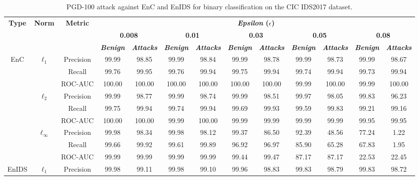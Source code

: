 \documentclass[conference]{IEEEtran}
\begin{document}
	\begin{table}[h]
		\caption{PGD-100 attack against EnC and EnIDS for binary classification on the CIC IDS2017 dataset.}
		\small
		\setlength{\tabcolsep}{1.6pt}
		\centering
		\label{tab:cic_bin_pgd}
		\begin{tabular}{|c|c|c|c|c|c|c|c|c|c|c|c|c|}
			\hline
			\multirow{3}{*}{\textbf{Type}} & \multirow{3}{*}{\textbf{Norm}} & \multirow{3}{*}{\textbf{Metric}} & \multicolumn{10}{c|}{\textbf{\textsl{Epsilon} ($\epsilon$)}} \\
			\cline{4-13}
			& & & \multicolumn{2}{c|}{\textbf{0.008}} & \multicolumn{2}{c|}{\textbf{0.01}} & \multicolumn{2}{c|}{\textbf{0.03}} & \multicolumn{2}{c|}{\textbf{0.05}} & \multicolumn{2}{c|}{\textbf{0.08}} \\
			\cline{4-13}
			& & & \textbf{\textsl{Benign}} & \textbf{\textsl{Attacks}} & \textbf{\textsl{Benign}} & \textbf{\textsl{Attacks}} & \textbf{\textsl{Benign}} & \textbf{\textsl{Attacks}} & \textbf{\textsl{Benign}} & \textbf{\textsl{Attacks}} & \textbf{\textsl{Benign}} & \textbf{\textsl{Attacks}} \\
			\hline
			\multirow{9}{*}{EnC} 
			& \multirow{3}{*}{\( \ell_1 \)} & Precision & 99.99 & 98.85 & 99.99 & 98.84 & 99.99 & 98.78 & 99.99 & 98.73 & 99.99 & 98.67 \\
			& & Recall & 99.76 & 99.95 & 99.76 & 99.94 & 99.75 & 99.94 & 99.74 & 99.94 & 99.73 & 99.94 \\
			& & ROC-AUC & 100.00 & 100.00 & 100.00 & 100.00 & 100.00 & 100.00 & 99.99 & 100.00 & 99.99 & 100.00 \\
			\cline{2-13}
			& \multirow{3}{*}{\( \ell_2 \)} & Precision & 99.99 & 98.77 & 99.99 & 98.74 & 99.99 & 98.51 & 99.97 & 98.05 & 99.83 & 96.23 \\
			& & Recall & 99.75 & 99.94 & 99.74 & 99.94 & 99.69 & 99.93 & 99.59 & 99.83 & 99.21 & 99.16 \\
			& & ROC-AUC & 100.00 & 100.00 & 99.99 & 100.00 & 99.99 & 99.99 & 99.99 & 99.99 & 99.95 & 99.95 \\
			\cline{2-13}
			& \multirow{3}{*}{\( \ell_\infty \)} & Precision & 99.98 & 98.34 & 99.98 & 98.12 & 99.37 & 86.50 & 92.39 & 48.56 & 77.24 & 1.22 \\
			& & Recall & 99.66 & 99.92 & 99.61 & 99.89 & 96.92 & 96.97 & 85.90 & 65.28 & 67.83 & 1.95 \\
			& & ROC-AUC & 99.99 & 99.99 & 99.99 & 99.99 & 99.44 & 99.47 & 87.17 & 87.17 & 22.53 & 22.45 \\
			\hline
			\multirow{9}{*}{EnIDS} 
			& \multirow{3}{*}{\( \ell_1 \)} & Precision & 99.98 & 99.11 & 99.98 & 99.10 & 99.96 & \cellcolor{yellow!50}98.83 & 99.83 & \cellcolor{yellow!50}98.79 & 99.83 & \cellcolor{yellow!50}98.72 \\

\end{tabular}
\end{table}
\end{document}
